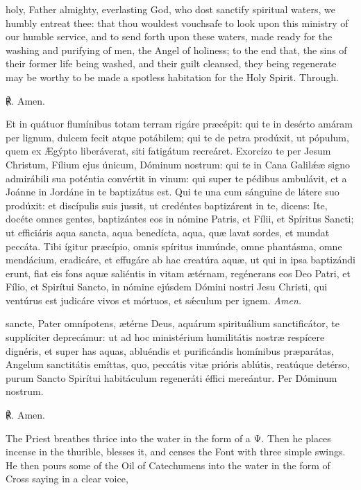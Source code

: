 {
{} holy, Father almighty, everlasting God, who dost sanctify spiritual waters, we humbly entreat thee: that thou wouldest vouchsafe to look upon this ministry of our humble service, and to send forth upon these waters, made ready for the washing and purifying of men, the Angel of holiness; to the end that, the sins of their former life being washed, and their guilt cleansed, they being regenerate may be worthy to be made a spotless habitation for the Holy Spirit. Through.\par
℟. Amen.}{Et in quátuor flumínibus totam terram rigáre pr{\ae}cépit: qui te in desérto amáram per lignum, dulcem fecit atque potábilem; qui te de petra prodúxit, ut pópulum, quem ex {\AE}gýpto liberáverat, siti fatigátum recreáret. Exorcízo te per Jesum Christum, Fílium ejus únicum, Dóminum nostrum: qui te in Cana Galilǽ{\ae} signo admirábili sua poténtia convértit in vinum: qui super te pédibus ambulávit, et a Joánne in Jordáne in te baptizátus est. Qui te una cum sánguine de látere suo prodúxit: et discípulis suis jussit, ut credéntes baptizárent in te, dicens: Ite, docéte omnes gentes, baptizántes eos in nómine Patris, et Fílii, et Spíritus Sancti; ut efficiáris aqua sancta, aqua benedícta, aqua, qu{\ae} lavat sordes, et mundat peccáta. Tibi ígitur pr{\ae}cípio, omnis spíritus immúnde, omne phantásma, omne mendácium, eradicáre, et effugáre ab hac creatúra aqu{\ae}, ut qui in ipsa baptizándi erunt, fiat eis fons aqu{\ae} saliéntis in vitam {\ae}térnam, regénerans eos Deo Patri, et Fílio, et Spirítui Sancto, in nómine ejúsdem Dómini nostri Jesu Christi, qui ventúrus est judicáre vivos et mórtuos, et sǽculum per ignem. \textit{Amen.}

\oremuslatin

 sancte, Pater omnípotens, {\ae}térne Deus, aquárum spirituálium sanctificátor, te supplíciter deprecámur: ut ad hoc ministérium humilitátis nostr{\ae} respícere dignéris, et super has aquas, abluéndis et purificándis homínibus pr{\ae}parátas, Angelum sanctitátis emíttas, quo, peccátis vit{\ae} prióris ablútis, reatúque detérso, purum Sancto Spirítui habitáculum regeneráti éffici mereántur. Per Dóminum nostrum.\par
℟. Amen.}


\begin{rubric}
    The Priest breathes thrice into the water in the form of a \textsc{Ψ}. Then he places incense in the thurible, blesses it, and censes the Font with three simple swings. He then pours some of the Oil of Catechumens into the water in the form of Cross saying in a clear voice,
\end{rubric}

